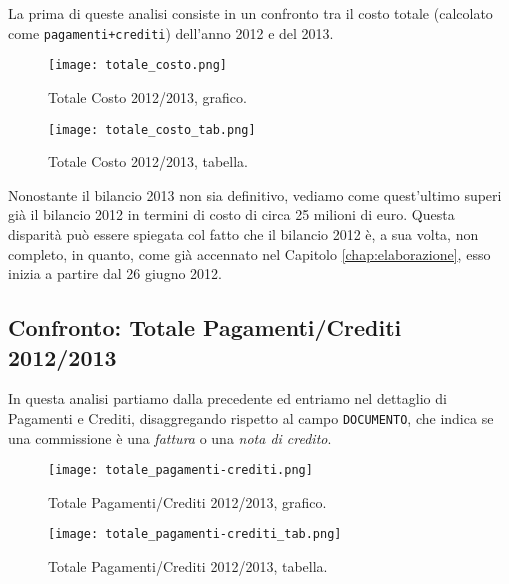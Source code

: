 			La prima di queste analisi consiste in un confronto tra il costo totale (calcolato come \texttt{pagamenti+crediti}) dell'anno 2012 e del 2013.\\
			
			\begin{figure}[h!]
				\centering
					\texttt{[image: totale\_costo.png]}
				\caption{Totale Costo 2012/2013, grafico.}
				\label{fig:totale_costo}
			\end{figure}
			
			\begin{figure}[h!]
				\centering
					\texttt{[image: totale\_costo\_tab.png]}
				\caption{Totale Costo 2012/2013, tabella.}
				\label{fig:totale_costo_tab}
			\end{figure}
			
			Nonostante il bilancio 2013 non sia definitivo, vediamo come quest'ultimo superi già il bilancio 2012 in termini di costo di circa 25 milioni di euro. Questa disparità può essere spiegata col fatto che il bilancio 2012 è, a sua volta, non completo, in quanto, come già accennato nel Capitolo \ref{chap:elaborazione}, esso inizia a partire dal 26 giugno 2012.
			
			\FloatBarrier
			
		\subsection{Confronto: Totale Pagamenti/Crediti 2012/2013} \label{subsce:pagamenti/crediti}
		
			In questa analisi partiamo dalla precedente ed entriamo nel dettaglio di Pagamenti e Crediti, disaggregando rispetto al campo \texttt{DOCUMENTO}, che indica se una commissione è una \textit{fattura} o una \textit{nota di credito}.\\
			
			\begin{figure}[h!]
				\centering
					\texttt{[image: totale\_pagamenti-crediti.png]}
				\caption{Totale Pagamenti/Crediti 2012/2013, grafico.}
				\label{fig:totale_pagamenti-crediti}
			\end{figure}
			
			\begin{figure}[h!]
				\centering
					\texttt{[image: totale\_pagamenti-crediti\_tab.png]}
				\caption{Totale Pagamenti/Crediti 2012/2013, tabella.}
				\label{fig:totale_pagamenti-crediti_tab}
			\end{figure}
			
